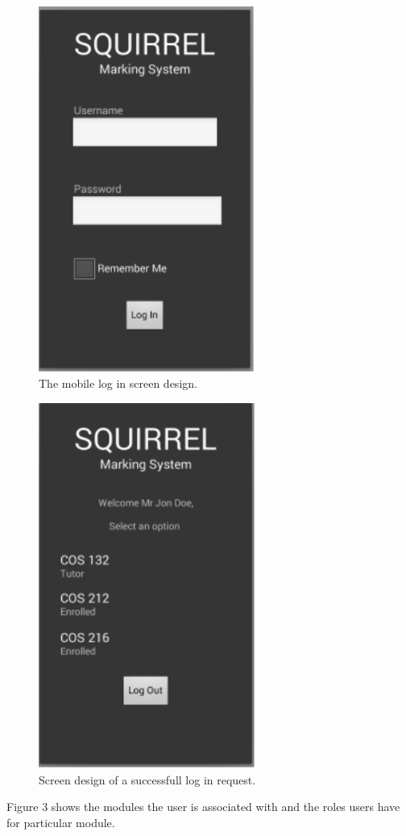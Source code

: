 \documentclass[12pt]{article}
\begin{document}
		\begin{figure}[htbp]
		\centering
		\includegraphics[width=0.7\linewidth, height=12cm]{./Diagrams/mobile_login}
		\caption{The mobile log in screen design.}
		\label{fig:mobile_login}
		\end{figure}
	
	\pagebreak
	
		\begin{figure}[htbp]
		\centering
		\includegraphics[width=0.7\linewidth, height=12cm]{./Diagrams/mobile_welcomeScreen}
		\caption{Screen design of a successfull log in request.}
		\label{fig:mobile_welcomeScreen}
		\end{figure}
		Figure 3 shows the modules the user is associated with and the roles users have for particular module. 
\end{document}
